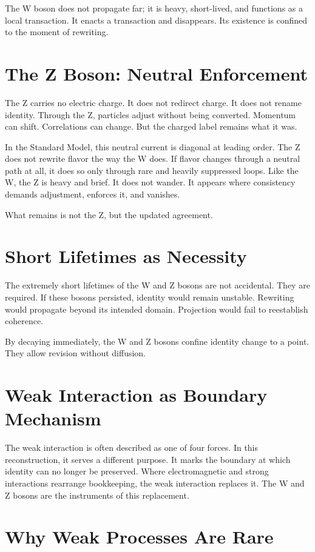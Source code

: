 \documentclass[11pt,twoside,openright]{book}
\begin{document}
The W boson does not propagate far; it is heavy, short-lived, and functions as a local transaction. It enacts a transaction and disappears. Its existence is confined to the moment of rewriting.

\section*{The Z Boson: Neutral Enforcement}

The Z carries no electric charge. It does not redirect charge. It does not rename identity. Through the Z, particles adjust without being converted. Momentum can shift. Correlations can change. But the charged label remains what it was.

In the Standard Model, this neutral current is diagonal at leading order. The Z does not rewrite flavor the way the W does. If flavor changes through a neutral path at all, it does so only through rare and heavily suppressed loops. Like the W, the Z is heavy and brief. It does not wander. It appears where consistency demands adjustment, enforces it, and vanishes.

What remains is not the Z, but the updated agreement.

\section*{Short Lifetimes as Necessity}

The extremely short lifetimes of the W and Z bosons are not accidental. They are required. If these bosons persisted, identity would remain unstable. Rewriting would propagate beyond its intended domain. Projection would fail to reestablish coherence.

By decaying immediately, the W and Z bosons confine identity change to a point. They allow revision without diffusion.

\section*{Weak Interaction as Boundary Mechanism}

The weak interaction is often described as one of four forces. In this reconstruction, it serves a different purpose. It marks the boundary at which identity can no longer be preserved. Where electromagnetic and strong interactions rearrange bookkeeping, the weak interaction replaces it. The W and Z bosons are the instruments of this replacement.

\section*{Why Weak Processes Are Rare}
\end{document}
